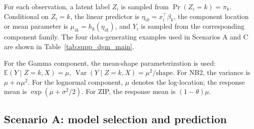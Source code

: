 \documentclass{article}
\newcommand{\E}{\mathbb{E}}
\begin{document}
For each observation, a latent label \(Z_i\) is sampled from
\(\Pr(Z_i=k)=\pi_k\).  Conditional on \(Z_i=k\), the linear predictor is
\(\eta_{ik}=x_i^\top\beta_k\), the component location or mean parameter is
\(\mu_{ik}=h_k(\eta_{ik})\), and \(Y_i\) is sampled from the corresponding
component family.  The four data-generating examples used in Scenarios A and C
are shown in Table~\ref{tab:supp_dgm_main}.

\begin{table}[htbp]
\centering
\caption{Data-generating models for Scenarios A and C.  The vectors displayed
are the raw regression coefficients, including the intercept.}
\label{tab:supp_dgm_main}
\end{table}

For the Gamma component, the mean-shape parameterization is used:
\(\E(Y\mid Z=k,X)=\mu\), \(\operatorname{Var}(Y\mid Z=k,X)=\mu^2/\text{shape}\).
For NB2, the variance is \(\mu+\alpha\mu^2\).  For the lognormal component,
\(\mu\) denotes the log-location; the response mean is
\(\exp(\mu+\sigma^2/2)\).  For ZIP, the response mean is
\((1-\theta)\mu\).

\subsection{Scenario A: model selection and prediction}
\end{document}
